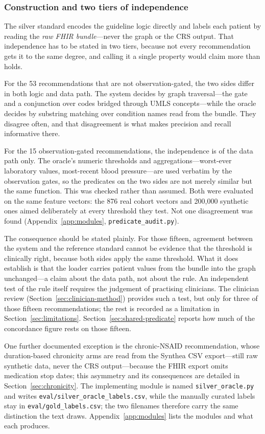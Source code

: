 \subsubsection*{Construction and two tiers of independence}
The silver standard encodes the guideline logic directly and labels
each patient by reading the \emph{raw FHIR bundle}---never the graph or the CRS output.
That independence has to be stated in two tiers, because not every recommendation gets it to
the same degree, and calling it a single property would claim more than holds.

For the 53 recommendations that are not observation-gated, the two sides differ in both logic
and data path. The system decides by graph traversal---the gate and a conjunction over codes
bridged through UMLS concepts---while the oracle decides by substring matching over condition
names read from the bundle. They disagree often, and that disagreement is what makes precision
and recall informative there.

For the 15 observation-gated recommendations, the independence is of the data path only. The
oracle's numeric thresholds and aggregations---worst-ever laboratory values, most-recent blood
pressure---are used verbatim by the observation gates, so the predicates on the two sides are
not merely similar but the same function. This was checked rather than assumed. Both were evaluated on the same feature vectors: the
876 real cohort vectors and 200{,}000 synthetic ones aimed deliberately at every threshold
they test. Not one disagreement was found (Appendix~\ref{app:modules},
\texttt{predicate\_audit.py}).

The consequence should be stated plainly. For those fifteen, agreement between the system and
the reference standard cannot be evidence that the threshold is clinically right, because both
sides apply the same threshold. What it does establish is that the loader carries patient
values from the bundle into the graph unchanged---a claim about the data path, not about the
rule. An independent test of the rule itself requires the judgement of practising clinicians.
The clinician review (Section~\ref{sec:clinician-method}) provides such a test, but only for
three of those fifteen recommendations; the rest is recorded as a limitation in
Section~\ref{sec:limitations}.
Section~\ref{sec:shared-predicate} reports how much of the concordance figure rests on those
fifteen.

One further documented exception is the chronic-NSAID recommendation, whose duration-based chronicity
arms are read from the Synthea CSV export---still raw synthetic data, never the CRS
output---because the FHIR export omits medication stop dates; this asymmetry and its
consequences are detailed in Section~\ref{sec:chronicity}.
The implementing module is named \texttt{silver\_oracle.py} and writes
\texttt{eval/silver\_oracle\_labels.csv}, while the manually curated labels stay in
\texttt{eval/gold\_labels.csv}; the two filenames therefore carry the same distinction the
text draws. Appendix~\ref{app:modules} lists the modules and what each produces.

